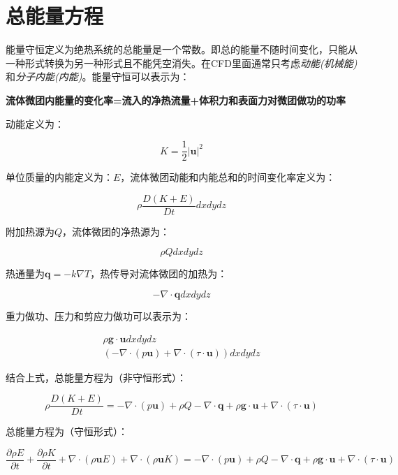 \section{总能量方程}
能量守恒定义为绝热系统的总能量是一个常数。即总的能量不随时间变化，只能从一种形式转换为另一种形式且不能凭空消失。在CFD里面通常只考虑\textit{动能(机械能)}和\textit{分子内能(内能)}。能量守恒可以表示为：

\begin{center}
\textbf{流体微团内能量的变化率=流入的净热流量+体积力和表面力对微团做功的功率}
\end{center}

动能定义为：

\begin{equation}
K=\frac{1}{2}|\mathbf{u}|^2
\end{equation}

单位质量的内能定义为：$ E $，流体微团动能和内能总和的时间变化率定义为：

\begin{equation}
\rho\frac{D(K+E)}{Dt}dxdydz
\end{equation}

附加热源为$ Q $，流体微团的净热源为：

\begin{equation}
\rho Qdxdydz
\end{equation}

热通量为$ \bm{q}=-k\nabla T $，热传导对流体微团的加热为：

\begin{equation}
-\nabla \cdot\bm{q}dxdydz
\end{equation}

重力做功、压力和剪应力做功可以表示为：

\begin{gather}
\rho\bm{g}\cdot\bm{u}dxdydz \\
(-\nabla\cdot(p\bm{u}) + \nabla\cdot(\tau\cdot\bm{u})) dxdydz
\end{gather}

结合上式，总能量方程为（非守恒形式）：

\begin{equation}
\rho\frac{D(K+E)}{Dt} =  -\nabla\cdot(p\bm{u}) + \rho Q - \nabla\cdot\bm{q} + \rho\bm{g}\cdot\bm{u} + \nabla\cdot(\tau\cdot\bm{u})
\end{equation}

总能量方程为（守恒形式）：

\begin{equation}
\frac{\partial\rho E}{\partial t} + \frac{\partial\rho K}{\partial t} + \nabla\cdot(\rho\bm{u}E) + \nabla\cdot(\rho\bm{u}K) = -\nabla\cdot(p\bm{u}) + \rho Q - \nabla\cdot\bm{q} + \rho\bm{g}\cdot\bm{u} + \nabla\cdot(\tau\cdot\bm{u})
\end{equation}

